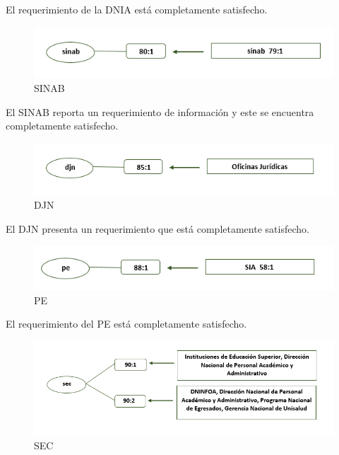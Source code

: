 \documentclass[
]{book}
\begin{document}
El requerimiento de la DNIA está completamente satisfecho.

\begin{figure}

{\centering \includegraphics[width=0.75\linewidth]{Imagenes/ima14} 

}

\caption{SINAB}\label{fig:unnamed-chunk-42}
\end{figure}

El SINAB reporta un requerimiento de información y este se encuentra completamente satisfecho.

\begin{figure}

{\centering \includegraphics[width=0.75\linewidth]{Imagenes/ima15} 

}

\caption{DJN}\label{fig:unnamed-chunk-43}
\end{figure}

El DJN presenta un requerimiento que está completamente satisfecho.

\begin{figure}

{\centering \includegraphics[width=0.75\linewidth]{Imagenes/ima16} 

}

\caption{PE}\label{fig:unnamed-chunk-44}
\end{figure}

El requerimiento del PE está completamente satisfecho.

\begin{figure}

{\centering \includegraphics[width=0.75\linewidth]{Imagenes/ima17} 

}

\caption{SEC}\label{fig:unnamed-chunk-45}
\end{figure}
\end{document}
